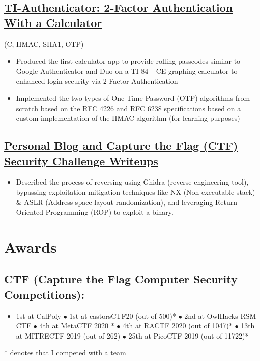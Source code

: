 \documentclass{article}
\begin{document}
\subsection{\href{https://github.com/jshin313/ti-authenticator}{\underline{TI-Authenticator: 2-Factor Authentication With a Calculator}}} \hfill (C, HMAC, SHA1, OTP)
\begin{itemize}
    \item Produced the first calculator app to provide rolling passcodes similar to Google Authenticator and Duo on a TI-84+ CE graphing calculator to enhanced login security via 2-Factor Authentication
    \item Implemented the two types of One-Time Password (OTP) algorithms from scratch based on the \href{https://tools.ietf.org/html/rfc4226}{\underline{RFC 4226}} and \href{https://tools.ietf.org/html/rfc6238}{\underline{RFC 6238}} specifications based on a custom implementation of the HMAC algorithm (for learning purposes)
\end{itemize}

\subsection{\href{https://jacobshin.com/posts/}{ \underline{Personal Blog and Capture the Flag (CTF) Security Challenge Writeups}}}
\begin{itemize}
    \item Described the process of reversing using Ghidra (reverse engineering tool), bypassing exploitation mitigation techniques like NX (Non-executable stack) \& ASLR (Address space layout randomization), and leveraging Return Oriented Programming (ROP) to exploit a binary.
\end{itemize}

\section{Awards}
\subsection{CTF (Capture the Flag Computer Security Competitions):}
\begin{itemize}
    \item 1st at CalPoly $\bullet$ 1st at castorsCTF20 (out of 500)* $\bullet$ 2nd at OwlHacks RSM CTF $\bullet$ 4th at MetaCTF 2020 * $\bullet$ 4th at RACTF 2020 (out of 1047)* $\bullet$ 13th at MITRECTF 2019 (out of 262) $\bullet$ 25th at PicoCTF 2019 (out of 11722)*

\end{itemize} 
* denotes that I competed with a team
\end{document}
